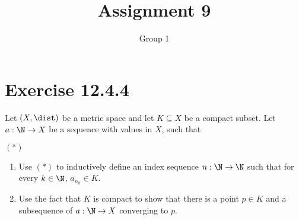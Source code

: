 \documentclass{assignment}
\title{Assignment 9}
\author{Group 1}
\begin{document}
\maketitle

\section{Exercise 12.4.4}
\begin{problem}
    Let $(X, \dist)$ be a metric space and let $K \subseteq X$ be a compact subset. Let $a: \N \to X$ be a sequence with values in $X$, such that
    \begin{myCenter}
    \end{myCenter}
    \vspace*{-\dimexpr\parskip+2\baselineskip}\hfill$(*)$
    \begin{enumerate}
        \item Use $(*)$ to inductively define an index sequence $n: \N \to \N$ such that for every $k \in \N$, $a_{n_k} \in K$.
        \item Use the fact that $K$ is compact to show that there is a point $p \in K$ and a subsequence of $a: \N \to X$ converging to $p$.
    \end{enumerate}
\end{problem}
\end{document}
